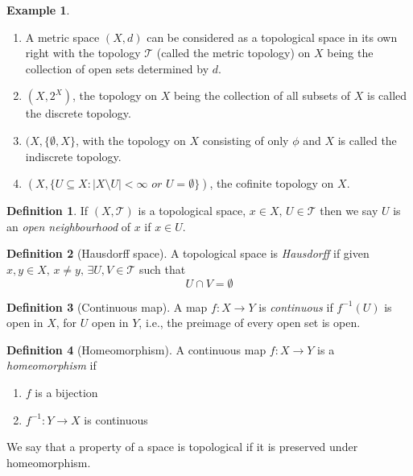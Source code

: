 \documentclass[a4paper,14pt]{extarticle}
\theoremstyle{definition}
\newtheorem*{definition}{Definition}
\newtheorem*{eg}{Example}
\begin{document}
\begin{eg} \hfill
	\begin{enumerate}
		\item A metric space $(X,d)$ can be considered as a topological space in its own right with the topology $\mathcal{T}$ (called the metric topology) on $X$ being the collection of 
			open sets determined by $d$.
		\item $(X,2^X)$, the topology on $X$ being the collection of all subsets of $X$ is called the discrete topology.
		\item $(X,\{\emptyset, X\}$, with the topology on $X$ consisting of only $\phi$ and $X$ is called the indiscrete topology.
		\item $(X,\{U\subseteq X:|X\setminus U|<\infty\textit{ or }U=\emptyset\})$, the cofinite topology on $X$.
	\end{enumerate}
\end{eg}

\begin{definition}
	If $(X,\mathcal{T})$ is a topological space, $x\in X, \,U\in\mathcal{T}$ then we say $U$ is an \emph{open neighbourhood} of $x$ if $x\in U$.
\end{definition}

\begin{definition}[Hausdorff space]
	A topological space is \emph{Hausdorff} if given $x,y\in X, \,x\neq y, \,\exists U,V\in\mathcal{T}$ such that \[U\cap V=\emptyset\]
\end{definition}

\begin{definition}[Continuous map]
	A map $f:X\to Y$ is \emph{continuous} if $f^{-1}(U)$ is open in $X$, for $U$ open in $Y$, i.e., the preimage of every open set is open.
\end{definition}

\begin{definition}[Homeomorphism]
	A continuous map $f:X\rightarrow Y$ is a \emph{homeomorphism} if
	\begin{enumerate}
		\item $f$ is a bijection
		\item $f^{-1}:Y\rightarrow X$ is continuous
	\end{enumerate}
\end{definition}

We say that a property of a space is topological if it is preserved under homeomorphism.
\end{document}
